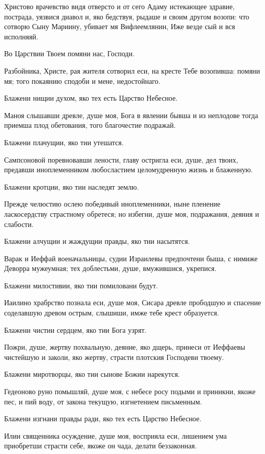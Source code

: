 Христово врачевство видя отверсто и от сего Адаму истекающее здравие, пострада, уязвися диавол и, яко бедствуя, рыдаше и своим другом возопи: что сотворю Сыну Мариину, убивает мя Вифлеемлянин, Иже везде сый и вся исполняяй. 


Во Царствии Твоем помяни нас, Господи.

Разбойника, Христе, рая жителя сотворил еси, на кресте Тебе возопивша: помяни мя; того покаянию сподоби и мене, недостойнаго.

Блажени нищии духом, яко тех есть Царство Небесное.

Маноя слышавши древле, душе моя, Бога в явлении бывша и из неплодове тогда приемша плод обетования, того благочестие подражай.

Блажени плачущии, яко тии утешатся.

Сампсоновой поревновавши лености, главу остригла еси, душе, дел твоих, предавши иноплеменником любосластием целомудренную жизнь и блаженную.

Блажени кротции, яко тии наследят землю.

Прежде челюстию ослею победивый иноплеменники, ныне пленение ласкосердству страстному обретеся; но избегни, душе моя, подражания, деяния и слабости.

Блажени алчущии и жаждущии правды, яко тии насытятся.

Варак и Иеффай военачальницы, судии Израилевы предпочтени быша, с нимиже Деворра мужеумная; тех доблестьми, душе, вмужившися, укрепися.

Блажени милостивии, яко тии помиловани будут.

Иаилино храбрство познала еси, душе моя, Сисара древле прободшую и спасение соделавшую древом острым, слышиши, имже тебе крест образуется.

Блажени чистии сердцем, яко тии Бога узрят.

Пожри, душе, жертву похвальную, деяние, яко дщерь, принеси от Иеффаевы чистейшую и заколи, яко жертву, страсти плотския Господеви твоему.

Блажени миротворцы, яко тии сынове Божии нарекутся.

Гедеоново руно помышляй, душе моя, с небесе росу подыми и приникни, якоже пес, и пий воду, от закона текущую, изгнетением письменным.

Блажени изгнани правды ради, яко тех есть Царство Небесное.

Илии священника осуждение, душе моя, восприяла еси, лишением ума приобретши страсти себе, якоже он чада, делати беззаконная.

